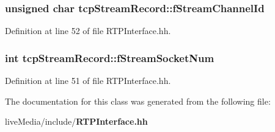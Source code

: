 \subsubsection[{f\+Stream\+Channel\+Id}]{\setlength{\rightskip}{0pt plus 5cm}unsigned char tcp\+Stream\+Record\+::f\+Stream\+Channel\+Id}\label{classtcpStreamRecord_a7a9c03670024de15b4c9386773cd8a3d}


Definition at line 52 of file R\+T\+P\+Interface.\+hh.

\subsubsection[{f\+Stream\+Socket\+Num}]{\setlength{\rightskip}{0pt plus 5cm}int tcp\+Stream\+Record\+::f\+Stream\+Socket\+Num}\label{classtcpStreamRecord_ae92559219cf6d430ba266e89af83c13e}


Definition at line 51 of file R\+T\+P\+Interface.\+hh.



The documentation for this class was generated from the following file\+:\begin{DoxyCompactItemize}
\item 
live\+Media/include/{\bf R\+T\+P\+Interface.\+hh}\end{DoxyCompactItemize}
